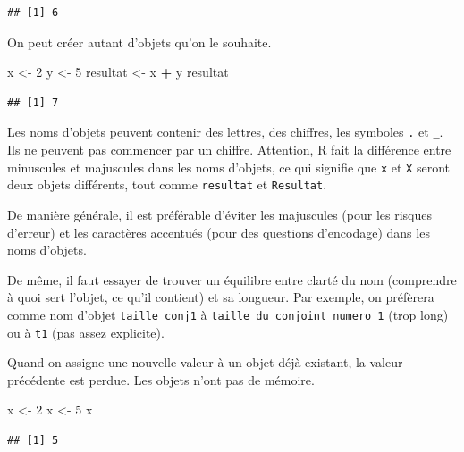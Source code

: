 \documentclass[12pt,]{book}
\makeatletter
\newenvironment{Shaded}{\begin{snugshade}}{\end{snugshade}}
\newcommand{\DecValTok}[1]{\textcolor[rgb]{0.06,0.06,0.06}{#1}}
\newcommand{\NormalTok}[1]{#1}
\newcommand{\OperatorTok}[1]{\textcolor[rgb]{0.43,0.43,0.43}{\textbf{#1}}}
\newcommand{\StringTok}[1]{\textcolor[rgb]{0.5,0.5,0.5}{#1}}
\newenvironment{kframe}{%
\medskip{}
\setlength{\fboxsep}{.8em}
 \def\at@end@of@kframe{}%
 \ifinner\ifhmode%
  \def\at@end@of@kframe{\end{minipage}}%
  \begin{minipage}{\columnwidth}%
 \fi\fi%
 \def\FrameCommand##1{\hskip\@totalleftmargin \hskip-\fboxsep
 \colorbox{shadecolor}{##1}\hskip-\fboxsep
     \hskip-\linewidth \hskip-\@totalleftmargin \hskip\columnwidth}%
 \MakeFramed {\advance\hsize-\width
   \@totalleftmargin\z@ \linewidth\hsize
   \@setminipage}}%
 {\par\unskip\endMakeFramed%
 \at@end@of@kframe}
\newenvironment{rmdblock}[1]
  {
  \begin{itemize}
  \renewcommand{\labelitemi}{
    \raisebox{-.7\height}[0pt][0pt]{
      {\setkeys{Gin}{width=3em,keepaspectratio}\texttt{[image: images/\#1]}}
    }
  }
  \setlength{\fboxsep}{1em}
  \begin{kframe}
  \item
  }
  {
  \end{kframe}
  \end{itemize}
  }
\newenvironment{rmdimportant}
  {\begin{rmdblock}{important}}
  {\end{rmdblock}}
\makeatother
\begin{document}
\begin{verbatim}
## [1] 6
\end{verbatim}

On peut créer autant d'objets qu'on le souhaite.

\begin{Shaded}
\begin{Highlighting}[]
\NormalTok{x <-}\StringTok{ }\DecValTok{2}
\NormalTok{y <-}\StringTok{ }\DecValTok{5}
\NormalTok{resultat <-}\StringTok{ }\NormalTok{x }\OperatorTok{+}\StringTok{ }\NormalTok{y}
\NormalTok{resultat}
\end{Highlighting}
\end{Shaded}

\begin{verbatim}
## [1] 7
\end{verbatim}

\begin{rmdimportant}
Les noms d'objets peuvent contenir des lettres, des chiffres, les symboles \texttt{.} et \texttt{\_}. Ils ne peuvent pas commencer par un chiffre. Attention, R fait la différence entre minuscules et majuscules dans les noms d'objets, ce qui signifie que \texttt{x} et \texttt{X} seront deux objets différents, tout comme \texttt{resultat} et \texttt{Resultat}.

De manière générale, il est préférable d'éviter les majuscules (pour les risques d'erreur) et les caractères accentués (pour des questions d'encodage) dans les noms d'objets.

De même, il faut essayer de trouver un équilibre entre clarté du nom (comprendre à quoi sert l'objet, ce qu'il contient) et sa longueur. Par exemple, on préfèrera comme nom d'objet \texttt{taille\_conj1} à \texttt{taille\_du\_conjoint\_numero\_1} (trop long) ou à \texttt{t1} (pas assez explicite).
\end{rmdimportant}

Quand on assigne une nouvelle valeur à un objet déjà existant, la valeur précédente est perdue. Les objets n'ont pas de mémoire.

\begin{Shaded}
\begin{Highlighting}[]
\NormalTok{x <-}\StringTok{ }\DecValTok{2}
\NormalTok{x <-}\StringTok{ }\DecValTok{5}
\NormalTok{x}
\end{Highlighting}
\end{Shaded}

\begin{verbatim}
## [1] 5
\end{verbatim}
\end{document}
